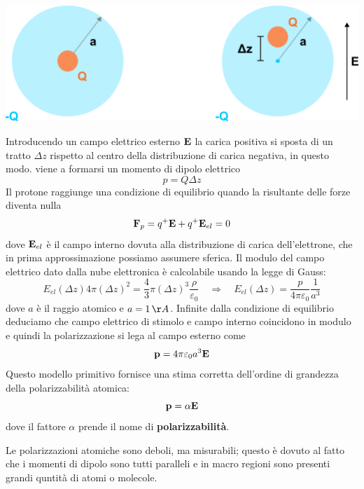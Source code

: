 \begin{center}
	\includegraphics{images/distribuzione}
\end{center}
Introducendo un campo elettrico esterno $\bold{E}$ la carica positiva si sposta di un tratto $\Delta z$ rispetto al centro della distribuzione di carica negativa, in questo modo. viene a formarsi un momento di dipolo elettrico
\begin{equation*}
	p = Q \Delta z
\end{equation*}
Il protone raggiunge una condizione di equilibrio quando la risultante delle forze diventa nulla 
\begin{equation*}
	\bold{F}_{p} = q^+ \bold{E} + q^+ \bold{E}_{el} = 0
\end{equation*}
dove $\bold{E}_{el}$ \`e il campo interno dovuta alla distribuzione di carica dell'elettrone, che in prima approssimazione possiamo assumere sferica. Il modulo del campo elettrico dato dalla nube elettronica \`e calcolabile usando la legge di Gauss:
\begin{equation*}
	E_{el}(\Delta z) 4 \pi (\Delta z)^2 = \frac{4}{3}\pi (\Delta z)^3 \frac{\rho}{\varepsilon_0} \quad \Rightarrow  \quad E_{el}(\Delta z) = \frac{p}{4 \pi \varepsilon_0} \frac{1}{a^3}
\end{equation*}
dove $a$ \`e il raggio atomico e $a  = 1 \,\AA $. Infinite dalla condizione di equilibrio deduciamo che campo elettrico di stimolo e campo interno coincidono in modulo e quindi la polarizzazione si lega al campo esterno come 
\begin{equation}
	\bold{p} = 4 \pi \varepsilon_0 a^3 \bold{E}
\end{equation}
Questo modello primitivo fornisce una stima corretta dell'ordine di grandezza della polarizzabilit\`a atomica:
\begin{equation}
	\bold{p} = \alpha \bold{E}
\end{equation}
dove il fattore $\alpha $ prende il nome di \textbf{polarizzabilit\`a}.

Le polarizzazioni atomiche sono deboli, ma misurabili; questo \`e dovuto al fatto che i momenti di dipolo sono tutti paralleli e in macro regioni sono presenti grandi quntit\`a di atomi o molecole.

